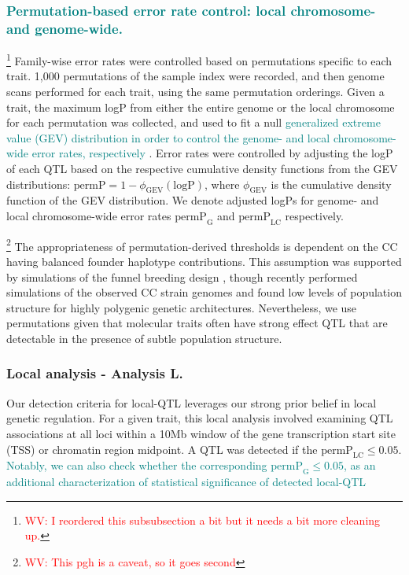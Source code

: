 \documentclass[9pt,twocolumn,twoside]{gsajnl}
\newcommand{\permplc}{\text{permP}_{\text{LC}}}
\newcommand{\permpg}{\text{permP}_{\text{G}}}
\newcommand{\WV}[2]{\textcolor{red}{#1\footnote{\textcolor{red}{WV: #2}}}}
\newcommand{\GKinline}[1]{\textcolor{teal}{#1}}
\begin{document}
\subsubsection{\GKinline{Permutation-based error rate control: local chromosome- and genome-wide.}}

\WV{}{I reordered this subsubsection a bit but it needs a bit more cleaning up.} 
Family-wise error rates were controlled based on permutations specific to each trait. 1,000 permutations of the sample index were recorded, and then genome scans performed for each trait, using the same permutation orderings. Given a trait, the maximum logP from either the entire genome or the local chromosome for each permutation was collected, and used to fit a null \GKinline{generalized extreme value (GEV) distribution \GKinline{in order to control the genome- and local chromosome-wide error rates, respectively}} \citep{Dudbridge2004}. 
Error rates were controlled by adjusting the logP of each QTL based on the respective cumulative density functions from the GEV distributions: $\text{permP} = 1 - \phi_{\text{GEV}}(\text{logP})$, where $\phi_{\text{GEV}}$ is the cumulative density function of the GEV distribution. We denote adjusted logPs for genome- and local chromosome-wide error rates $\permpg$ and $\permplc$ respectively.

\WV{}{This pgh is a caveat, so it goes second} The appropriateness of permutation-derived thresholds \citep{Doerge1996} is dependent on the CC having balanced founder haplotype contributions. This assumption was supported by simulations of the funnel breeding design \citep{Valdar2006c}, though recently \cite{Keele2019} performed simulations of the observed CC strain genomes and found low levels of population structure for highly polygenic genetic architectures. Nevertheless, we use permutations given that molecular traits often have strong effect QTL that are detectable in the presence of subtle population structure.

\subsubsection{Local analysis - Analysis L.} 
Our detection criteria for local-QTL leverages our strong prior belief in local genetic regulation. For a given trait, this local analysis involved examining QTL associations at all loci within a 10Mb window of the gene transcription start site (TSS) or chromatin region midpoint. A QTL was detected if the $\text{permP}_{\text{LC}} \leq 0.05$. \GKinline{Notably, we can also check whether the corresponding $\text{permP}_{\text{G}} \leq 0.05$, as an additional characterization of statistical significance of detected local-QTL}
\end{document}
